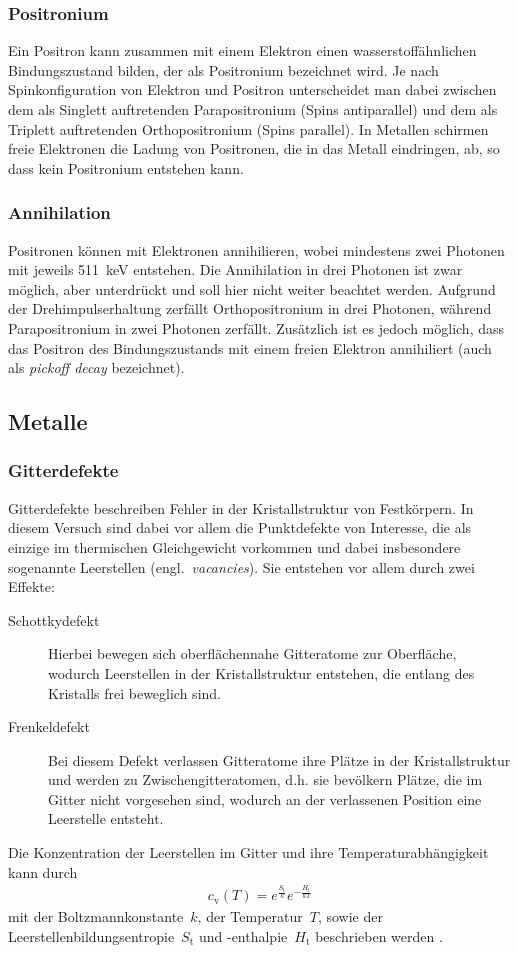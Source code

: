 \documentclass[11pt, a4paper]{article}
\numberwithin{equation}{section}
\begin{document}
\subsubsection{Positronium}

Ein Positron kann zusammen mit einem Elektron einen wasserstoffähnlichen Bindungszustand bilden, der als Positronium bezeichnet wird.
Je nach Spinkonfiguration von Elektron und Positron unterscheidet man dabei zwischen dem als Singlett auftretenden Parapositronium (Spins antiparallel) und dem als Triplett auftretenden Orthopositronium (Spins parallel).
In Metallen schirmen freie Elektronen die Ladung von Positronen, die in das Metall eindringen, ab, so dass kein Positronium entstehen kann.

\subsubsection{Annihilation}

Positronen können mit Elektronen annihilieren, wobei mindestens zwei Photonen mit jeweils \SI{511}{keV} entstehen.
Die Annihilation in drei Photonen ist zwar möglich, aber unterdrückt und soll hier nicht weiter beachtet werden.
Aufgrund der Drehimpulserhaltung zerfällt Orthopositronium in drei Photonen, während Parapositronium in zwei Photonen zerfällt.
Zusätzlich ist es jedoch möglich, dass das Positron des Bindungszustands mit einem freien Elektron annihiliert (auch als \textit{pickoff decay} bezeichnet). 

\subsection{Metalle}
\subsubsection{Gitterdefekte}
Gitterdefekte beschreiben Fehler in der Kristallstruktur von Festkörpern.
In diesem Versuch sind dabei vor allem die Punktdefekte von Interesse, die als einzige im thermischen Gleichgewicht vorkommen und dabei insbesondere sogenannte Leerstellen (engl.~\textit{vacancies}).
Sie entstehen vor allem durch zwei Effekte:
\begin{description}
	\item[Schottkydefekt] Hierbei bewegen sich oberflächennahe Gitteratome zur Oberfläche, wodurch Leerstellen in der Kristallstruktur entstehen, die entlang des Kristalls frei beweglich sind.
	\item[Frenkeldefekt] Bei diesem Defekt verlassen Gitteratome ihre Plätze in der Kristallstruktur und werden zu Zwischengitteratomen, d.h. sie bevölkern Plätze, die im Gitter nicht vorgesehen sind, wodurch an der verlassenen Position eine Leerstelle entsteht.
\end{description}
Die Konzentration der Leerstellen im Gitter und ihre Temperaturabhängigkeit kann durch
\begin{align}
c_\mathrm{v}(T) = e^{\frac{S_\mathrm{t}}{k}}e^{-\frac{H_\mathrm{t}}{k T}}
\label{eq:vac_conc}
\end{align}
mit der Boltzmannkonstante~$k$, der Temperatur~$T$, sowie der Leerstellenbildungsentropie~$S_\mathrm{t}$ und -enthalpie~$H_\mathrm{t}$ beschrieben werden \cite{add_infos}.
\end{document}
